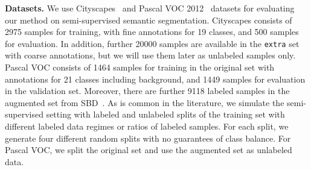 \textbf{Datasets.} We use Cityscapes~\cite{cityscapes} and Pascal VOC 2012~\cite{voc} datasets for evaluating our method on semi-supervised semantic segmentation. Cityscapes consists of 2975 samples for training, with fine annotations for 19 classes, and 500 samples for evaluation. In addition, further 20000 samples are available in the \texttt{extra} set with coarse annotations, but we will use them later as unlabeled samples only. Pascal VOC consists of 1464 samples for training in the original set with annotations for 21 classes including background, and 1449 samples for evaluation in the validation set. Moreover, there are further 9118 labeled samples in the augmented set from SBD~\cite{sbd}. As is common in the literature, we simulate the semi-supervised setting with labeled and unlabeled splits of the training set with different labeled data regimes or ratios of labeled samples. For each split, we generate four different random splits with no guarantees of class balance. For Pascal VOC, we split the original set and use the augmented set as unlabeled data.




